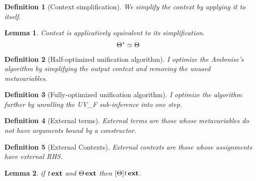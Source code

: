 \documentclass[a4,natbib=false]{article}
\newtheorem{definition}{Definition}
\newtheorem{lemma}{Lemma}
\begin{document}
\begin{definition}[Context simplification]
  We simplify the context by applying it to itself.

  \ottfundefnsimpl{}
\end{definition}

\begin{lemma}
  Context is applicatively equivalent to its simplification.
  \[  \Theta ^{\color{red}\star}  \simeq \Theta \]
\end{lemma}

\begin{definition}[Half-optimized unification algorithm]
  \label{def:half}
  I optimize the Ambroise's algorithm by simplifying the output context and
  removing the unused metavariables.

  \ottdefnun{}
\end{definition}

\begin{definition}[Fully-optimized unification algorithm]
  \label{def:full}
  I optimize the algorithm further by unrolling the UV\_F sub-inference into one step. 

  \ottdefnaunTwo{}
\end{definition}


\begin{definition}[External terms]
  External terms are those whose metavariables do not have arguments bound by a
  constructor.

  \ottdefnaext{}
\end{definition}

\begin{definition}[External Contexts]
  External contexts are those whose assignments have external RHS. 
  
  \ottdefnaextC{}
\end{definition}

\begin{lemma}
  \label{lemma:ext-app}
  if $ \mathit{t} \, \mathbf{ext} $ and $ \Theta \, \mathbf{ext} $ then $ [  \Theta  ]  \mathit{t} \, \mathbf{ext} $.
\end{lemma}
\end{document}
